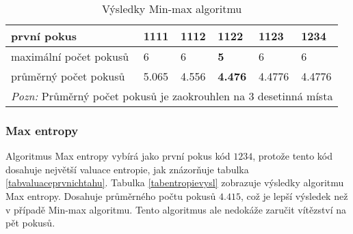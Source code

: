 
\begin{table}[h]
\centering
\begin{tabular}{l l l l l l}
\toprule
první pokus & 1111 & 1112 & \textbf{1122} & 1123 & 1234 \\
\midrule

maximální počet pokusů 
& 6 & 6 & \textbf{5} & 6 & 6 \\

průměrný počet pokusů 
& 5.065 & 4.556 & \textbf{4.476} & 4.4776 & 4.4776\\
\bottomrule
\multicolumn{6}{l}{\footnotesize \textit{Pozn:}
Průměrný počet pokusů je zaokrouhlen na $3$ desetinná místa}
\end{tabular}
\caption{Výsledky Min-max algoritmu}\label{tabminmaxvysl}
\end{table}

\subsubsection{Max entropy}

Algoritmus Max entropy vybírá jako první pokus kód $1234$, protože tento kód dosahuje největší valuace entropie, jak znázorňuje tabulka \ref{tabvaluaceprvnichtahu}. Tabulka \ref{tabentropievysl} zobrazuje výsledky algoritmu Max entropy. Dosahuje průměrného počtu pokusů $4.415$, což je lepší výsledek než v případě Min-max algoritmu. Tento algoritmus ale nedokáže zaručit vítězství na pět pokusů.

